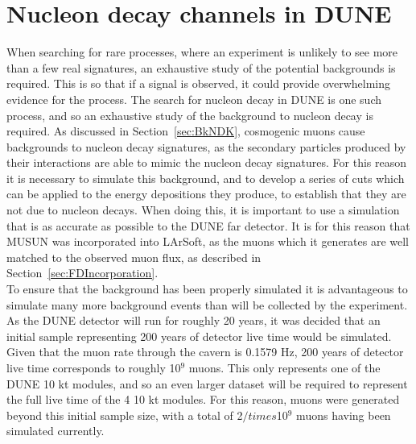 \section{Nucleon decay channels in DUNE} \label{sec:DUNENDK} %
When searching for rare processes, where an experiment is unlikely to see more than a few real signatures, an exhaustive study of the potential backgrounds is required. This is so that if a signal is observed, it could provide overwhelming evidence for the process. The search for nucleon decay in DUNE is one such process, and so an exhaustive study of the background to nucleon decay is required. As discussed in Section~\ref{sec:BkNDK}, cosmogenic muons cause backgrounds to nucleon decay signatures, as the secondary particles produced by their interactions are able to mimic the nucleon decay signatures. For this reason it is necessary to simulate this background, and to develop a series of cuts which can be applied to the energy depositions they produce, to establish that they are not due to nucleon decays. When doing this, it is important to use a simulation that is as accurate as possible to the DUNE far detector. It is for this reason that MUSUN was incorporated into LArSoft, as the muons which it generates are well matched to the observed muon flux, as described in Section~\ref{sec:FDIncorporation}. \\

To ensure that the background has been properly simulated it is advantageous to simulate many more background events than will be collected by the experiment. As the DUNE detector will run for roughly 20 years, it was decided that an initial sample representing 200 years of detector live time would be simulated. Given that the muon rate through the cavern is 0.1579 Hz, 200 years of detector live time corresponds to roughly 10$^9$ muons. This only represents one of the DUNE 10 kt modules, and so an even larger dataset will be required to represent the full live time of the 4 10 kt modules. For this reason, muons were generated beyond this initial sample size, with a total of 2$/times$10$^9$ muons having been simulated currently. \\

